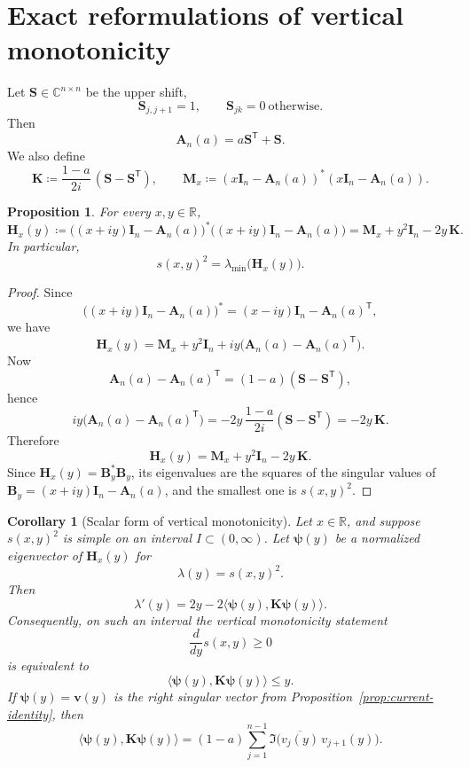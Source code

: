 \documentclass[11pt]{article}
\newtheorem{proposition}[theorem]{Proposition}
\newtheorem{corollary}[theorem]{Corollary}
\begin{document}
\section{Exact reformulations of vertical monotonicity}

Let \(\mathbf S\in\mathbb C^{n\times n}\) be the upper shift,
\[
\mathbf S_{j,j+1}=1,
\qquad
\mathbf S_{jk}=0\ \text{otherwise}.
\]
Then
\[
\mathbf A_n(a)=a\mathbf S^{\mathsf T}+\mathbf S.
\]
We also define
\[
\mathbf K\coloneqq \frac{1-a}{2i}\,(\mathbf S-\mathbf S^{\mathsf T}),
\qquad
\mathbf M_x\coloneqq (x\mathbf I_n-\mathbf A_n(a))^*(x\mathbf I_n-\mathbf A_n(a)).
\]

\begin{proposition}\label{prop:H-affine}
For every \(x,y\in\mathbb R\),
\[
\mathbf H_x(y)\coloneqq \bigl((x+iy)\mathbf I_n-\mathbf A_n(a)\bigr)^*\bigl((x+iy)\mathbf I_n-\mathbf A_n(a)\bigr)
=
\mathbf M_x+y^2\mathbf I_n-2y\,\mathbf K.
\]
In particular,
\[
s(x,y)^2=\lambda_{\min}\!\bigl(\mathbf H_x(y)\bigr).
\]
\end{proposition}

\begin{proof}
Since
\[
\bigl((x+iy)\mathbf I_n-\mathbf A_n(a)\bigr)^*
=
(x-iy)\mathbf I_n-\mathbf A_n(a)^{\mathsf T},
\]
we have
\[
\mathbf H_x(y)
=
\mathbf M_x
+y^2\mathbf I_n
+iy\bigl(\mathbf A_n(a)-\mathbf A_n(a)^{\mathsf T}\bigr).
\]
Now
\[
\mathbf A_n(a)-\mathbf A_n(a)^{\mathsf T}
=
(1-a)(\mathbf S-\mathbf S^{\mathsf T}),
\]
hence
\[
iy\bigl(\mathbf A_n(a)-\mathbf A_n(a)^{\mathsf T}\bigr)
=
-2y\,\frac{1-a}{2i}(\mathbf S-\mathbf S^{\mathsf T})
=
-2y\,\mathbf K.
\]
Therefore
\[
\mathbf H_x(y)=\mathbf M_x+y^2\mathbf I_n-2y\,\mathbf K.
\]
Since \(\mathbf H_x(y)=\mathbf B_y^*\mathbf B_y\), its eigenvalues are the squares of the singular values of \(\mathbf B_y=(x+iy)\mathbf I_n-\mathbf A_n(a)\), and the smallest one is \(s(x,y)^2\).
\end{proof}

\begin{corollary}[Scalar form of vertical monotonicity]\label{cor:scalar-form}
Let \(x\in\mathbb R\), and suppose \(s(x,y)^2\) is simple on an interval \(I\subset(0,\infty)\). Let \(\boldsymbol{\psi}(y)\) be a normalized eigenvector of \(\mathbf H_x(y)\) for
\[
\lambda(y)=s(x,y)^2.
\]
Then
\[
\lambda'(y)=2y-2\langle \boldsymbol{\psi}(y),\mathbf K\boldsymbol{\psi}(y)\rangle.
\]
Consequently, on such an interval the vertical monotonicity statement
\[
\frac{d}{dy}s(x,y)\ge 0
\]
is equivalent to
\[
\langle \boldsymbol{\psi}(y),\mathbf K\boldsymbol{\psi}(y)\rangle\le y.
\]
If \(\boldsymbol{\psi}(y)=\mathbf v(y)\) is the right singular vector from Proposition~\ref{prop:current-identity}, then
\[
\langle \boldsymbol{\psi}(y),\mathbf K\boldsymbol{\psi}(y)\rangle
=
(1-a)\sum_{j=1}^{n-1}\Im\!\bigl(\overline{v_j(y)}\,v_{j+1}(y)\bigr).
\]
\end{corollary}
\end{document}

